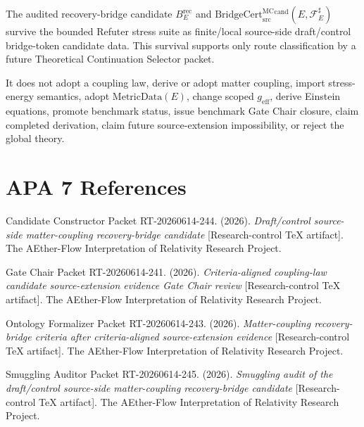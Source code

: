 \documentclass[11pt]{article}
\newcommand{\geff}{g_{\mathrm{eff}}}
\newcommand{\MetricData}{\mathrm{MetricData}}
\newcommand{\BridgeCert}{\mathrm{BridgeCert}_{\mathrm{src}}^{\mathrm{MC}}}
\newcommand{\BErec}{B_E^{\mathrm{rec}}}
\begin{document}
The audited recovery-bridge candidate \(\BErec\) and
\(\BridgeCert^{\mathrm{cand}}(E,\mathcal{F}_E^\sharp)\) survive the bounded
Refuter stress suite as finite/local source-side draft/control bridge-token
candidate data. This survival supports only route classification by a future
Theoretical Continuation Selector packet.

It does not adopt a coupling law, derive or adopt matter coupling, import
stress-energy semantics, adopt \(\MetricData(E)\), change scoped \(\geff\),
derive Einstein equations, promote benchmark status, issue benchmark Gate
Chair closure, claim completed derivation, claim future source-extension
impossibility, or reject the global theory.

\section{APA 7 References}

Candidate Constructor Packet RT-20260614-244. (2026). \emph{Draft/control
source-side matter-coupling recovery-bridge candidate} [Research-control TeX
artifact]. The AEther-Flow Interpretation of Relativity Research Project.

Gate Chair Packet RT-20260614-241. (2026). \emph{Criteria-aligned
coupling-law candidate source-extension evidence Gate Chair review}
[Research-control TeX artifact]. The AEther-Flow Interpretation of Relativity
Research Project.

Ontology Formalizer Packet RT-20260614-243. (2026). \emph{Matter-coupling
recovery-bridge criteria after criteria-aligned source-extension evidence}
[Research-control TeX artifact]. The AEther-Flow Interpretation of Relativity
Research Project.

Smuggling Auditor Packet RT-20260614-245. (2026). \emph{Smuggling audit of
the draft/control source-side matter-coupling recovery-bridge candidate}
[Research-control TeX artifact]. The AEther-Flow Interpretation of Relativity
Research Project.
\end{document}
